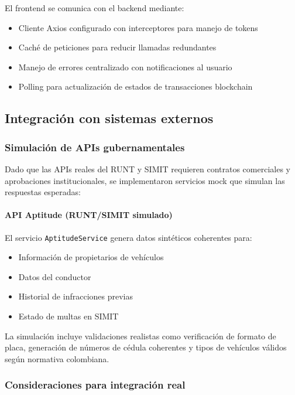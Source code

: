 El frontend se comunica con el backend mediante:
\begin{itemize}
    \item Cliente Axios configurado con interceptores para manejo de tokens
    \item Caché de peticiones para reducir llamadas redundantes
    \item Manejo de errores centralizado con notificaciones al usuario
    \item Polling para actualización de estados de transacciones blockchain
\end{itemize}

\subsection{Integración con sistemas externos}

\subsubsection{Simulación de APIs gubernamentales}

Dado que las APIs reales del RUNT y SIMIT requieren contratos comerciales y aprobaciones institucionales, se implementaron servicios mock que simulan las respuestas esperadas:

\paragraph{API Aptitude (RUNT/SIMIT simulado)}
El servicio \texttt{AptitudeService} genera datos sintéticos coherentes para:
\begin{itemize}
    \item Información de propietarios de vehículos
    \item Datos del conductor
    \item Historial de infracciones previas
    \item Estado de multas en SIMIT
\end{itemize}

La simulación incluye validaciones realistas como verificación de formato de placa, generación de números de cédula coherentes y tipos de vehículos válidos según normativa colombiana.

\subsubsection{Consideraciones para integración real}

